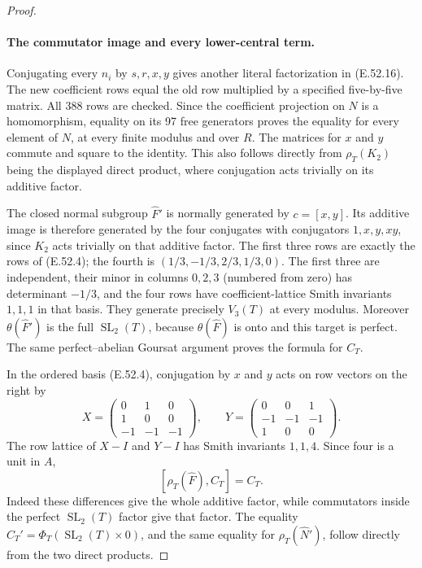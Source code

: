 \begin{proof}
\paragraph{The commutator image and every lower-central term.}
Conjugating every $n_i$ by $s,r,x,y$ gives another
literal factorization in \textup{(E.52.16)}.
The new coefficient rows equal the old row multiplied
by a specified five-by-five matrix. All 388 rows
are checked. Since the coefficient projection on
$N$ is a homomorphism, equality on its 97 free
generators proves the equality for every element
of $N$, at every finite modulus and over $R$.
The matrices for $x$ and $y$ commute and square to
the identity. This also follows directly from
$\rho_T(K_2)$ being the displayed direct product,
where conjugation acts trivially on its additive
factor.

The closed normal subgroup $\widehat F'$ is normally
generated by $c=[x,y]$. Its additive image is therefore
generated by the four conjugates with conjugators
$1,x,y,xy$, since $K_2$ acts trivially on that
additive factor. The first three rows are exactly
the rows of \textup{(E.52.4)}; the fourth is
$(1/3,-1/3,2/3,1/3,0)$.
The first three are independent, their minor in columns
$0,2,3$ (numbered from zero) has determinant $-1/3$, and
the four rows have coefficient-lattice Smith
invariants $1,1,1$ in that basis.
They generate precisely $V_3(T)$ at every modulus.
Moreover $\theta(\widehat F')$ is the full
$\operatorname{SL}_2(T)$, because $\theta(\widehat F)$
is onto and this target is perfect.
The same perfect--abelian Goursat argument proves
the formula for $C_T$.

In the ordered basis \textup{(E.52.4)}, conjugation
by $x$ and $y$ acts on row vectors on the right by
\[
 X=\begin{pmatrix}0&1&0\\1&0&0\\-1&-1&-1\end{pmatrix},
 \qquad
 Y=\begin{pmatrix}0&0&1\\-1&-1&-1\\1&0&0\end{pmatrix}.
 \tag{E.52.21}
\]
The row lattice of $X-I$ and $Y-I$ has Smith
invariants $1,1,4$. Since four is a unit in $A$,
\[
 [\rho_T(\widehat F),C_T]=C_T.
 \tag{E.52.22}
\]
Indeed these differences give the whole additive
factor, while commutators inside the perfect
$\operatorname{SL}_2(T)$ factor give that factor.
The equality $C_T'=\Phi_T(\operatorname{SL}_2(T)\times0)$,
and the same equality for $\rho_T(\widehat N')$,
follow directly from the two direct products.


\end{proof}
